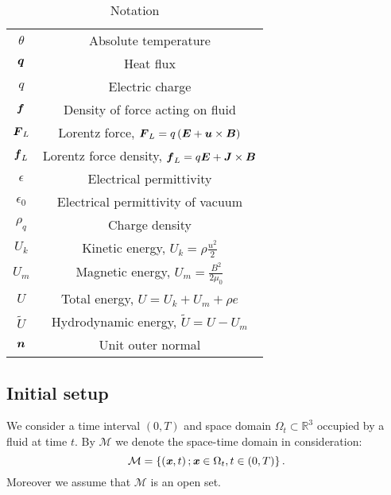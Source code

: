 \begin{table}
\begin{tabular}{ |c|c| }
        $\theta$ & Absolute temperature\\
        $\mbox{\boldmath $q$}$ & Heat flux\\
        $q$ & Electric charge\\
        $\mbox{\boldmath $f$}$ & Density of force acting on fluid\\
        $\mbox{\boldmath $F$}_L$ & Lorentz force, $\mbox{\boldmath $F$}_L = q\left(\mbox{\boldmath $E$} + \mbox{\boldmath $u$}\times\mbox{\boldmath $B$}\right)$\\
        $\mbox{\boldmath $f$}_L$ & Lorentz force density, $\mbox{\boldmath $f$}_L = q\mbox{\boldmath $E$} + \mbox{\boldmath $J$}\times\mbox{\boldmath $B$}$\\
        $\epsilon$ & Electrical permittivity\\
        $\epsilon_0$ & Electrical permittivity of vacuum\\
        $\rho_q$ & Charge density\\
        $U_k$ & Kinetic energy, $U_k = \rho\frac{u^2}{2}$ \\ 
        $U_m$ & Magnetic energy, $U_m = \frac{B^2}{2{}\mu_0}$ \\ 
        $U$ & Total energy, $U = U_k + U_m + \rho e$ \\ 
        $\tilde{U}$ & Hydrodynamic energy, $\tilde{U} = U - U_m$ \\ 
        $\mbox{\boldmath $n$}$ & Unit outer normal \\ 
        \hline
    \end{tabular}
    \caption{Notation}
    \label{table:notation}
\end{table}

\subsection{Initial setup}

We consider a time interval $\left(0,T\right)$ and space domain $\Omega_{t}\subset \mathbb{R}^3$ occupied by a fluid at time $t$.
By $\mathcal{M}$ we denote the space-time domain in consideration: 
\begin{equation}\label{M}
\mathcal{M}=\left\{\left(\textbf{\textit{x}},t\right);\\\textbf{\textit{x}}\in\Omega_{t},t\in\left(0,T\right)\right \}.
\end{equation}
Moreover we assume that $\mathcal{M}$ is an open set.


